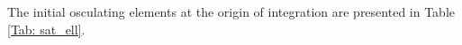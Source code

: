 The initial osculating elements at the origin of integration are presented in Table \ref{Tab: sat_ell}.%


